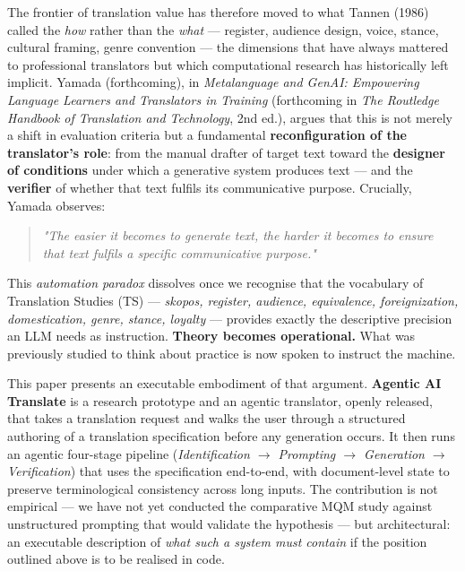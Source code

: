 \documentclass[11pt]{article}
\begin{document}
The frontier of translation value has therefore moved to what Tannen (1986) called the \emph{how} rather than the \emph{what} --- register, audience design, voice, stance, cultural framing, genre convention --- the dimensions that have always mattered to professional translators but which computational research has historically left implicit. Yamada (forthcoming), in \emph{Metalanguage and GenAI: Empowering Language Learners and Translators in Training} (forthcoming in \emph{The Routledge Handbook of Translation and Technology}, 2nd ed.), argues that this is not merely a shift in evaluation criteria but a fundamental \textbf{reconfiguration of the translator's role}: from the manual drafter of target text toward the \textbf{designer of conditions} under which a generative system produces text --- and the \textbf{verifier} of whether that text fulfils its communicative purpose. Crucially, Yamada observes:

\begin{quote}\itshape "The easier it becomes to generate text, the harder it becomes to ensure that text fulfils a specific communicative purpose."\end{quote}

This \emph{automation paradox} dissolves once we recognise that the vocabulary of Translation Studies (TS) --- \emph{skopos, register, audience, equivalence, foreignization, domestication, genre, stance, loyalty} --- provides exactly the descriptive precision an LLM needs as instruction. \textbf{Theory becomes operational.} What was previously studied to think about practice is now spoken to instruct the machine.

This paper presents an executable embodiment of that argument. \textbf{Agentic AI Translate} is a research prototype and an agentic translator, openly released, that takes a translation request and walks the user through a structured authoring of a translation specification before any generation occurs. It then runs an agentic four-stage pipeline (\emph{Identification $\rightarrow$ Prompting $\rightarrow$ Generation $\rightarrow$ Verification}) that uses the specification end-to-end, with document-level state to preserve terminological consistency across long inputs. The contribution is not empirical --- we have not yet conducted the comparative MQM study against unstructured prompting that would validate the hypothesis --- but architectural: an executable description of \emph{what such a system must contain} if the position outlined above is to be realised in code.
\end{document}
